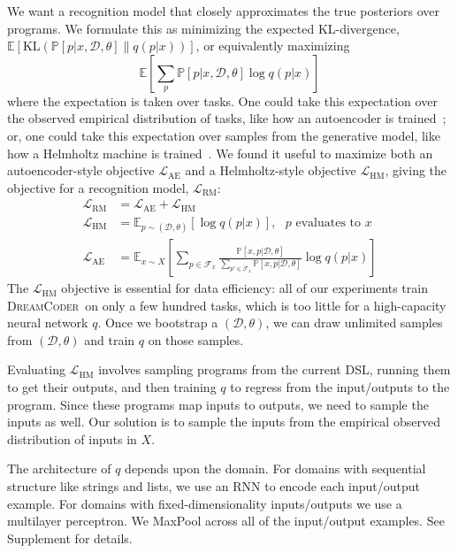 \documentclass{article}
\newcommand{\system}{\textsc{DreamCoder}~}
\newcommand{\expect}{\mathds{E}} %
\newcommand{\probability}{\mathds{P}} %
\begin{document}
We want a recognition model that closely approximates the true posteriors over programs. We formulate this as minimizing the expected KL-divergence, $  \expect\left[\text{KL}\left(\probability[p|x,\mathcal{D},\theta]\|q(p|x) \right) \right]$,
or equivalently maximizing
\begin{equation*}
  \expect\left[\sum_p\probability[p|x,\mathcal{D},\theta]\log q(p|x) \right]
\end{equation*}
where the expectation is taken over tasks. One could take this expectation
over the observed empirical distribution of tasks,
like how an autoencoder is trained~\cite{hinton2006reducing}; or, one could take this expectation over samples from the generative model, like how a Helmholtz machine is trained~\cite{dayan1995helmholtz}.
We found it useful to maximize both an autoencoder-style objective $\mathcal{L}_{\text{AE}}$ and a Helmholtz-style objective $\mathcal{L}_{\text{HM}}$, giving the  objective for a recognition model, $\mathcal{L}_{\text{RM}}$:
\begin{align}
\mathcal{L}_{\text{RM}}& = \mathcal{L}_\text{AE} + \mathcal{L}_\text{HM}\\
\mathcal{L}_{\text{HM}}& = \expect_{p\sim(\mathcal{D},\theta) }\left[\log q(p|x)\right],\text{ $p$ evaluates to $x$}\nonumber\\
\mathcal{L}_{\text{AE}}& = \expect_{x\sim X}\left[\sum_{p\in \mathcal{F}_x}
  \frac{\probability\left[x,p|\mathcal{D},\theta \right]}{\sum_{p'\in \mathcal{F}_x}\probability\left[x,p|\mathcal{D},\theta \right]}\log q(p|x)\right]\nonumber
\end{align}
The $\mathcal{L}_{\text{HM}}$ objective is essential for data efficiency:
all of our experiments train \system on only a few hundred tasks, which is too little for
a high-capacity neural network $q$.
Once we bootstrap a $(\mathcal{D},\theta)$,
we can draw unlimited samples from $(\mathcal{D},\theta)$
and train $q$ on those samples.

Evaluating $\mathcal{L}_{\text{HM}}$ involves sampling programs from
the current DSL, running them to get their outputs,
and then training $q$ to regress from the input/outputs to the program.
Since these programs map inputs to outputs,
we need to sample the inputs as well.
Our solution is to sample the inputs
from the empirical observed distribution of inputs in $X$.

The architecture of $q$ depends upon the domain.
For domains with sequential structure like strings and lists,
we use an RNN to encode each input/output example.
For domains with fixed-dimensionality inputs/outputs we use a multilayer perceptron.
We MaxPool across all of the input/output examples. See Supplement for details.
\end{document}
